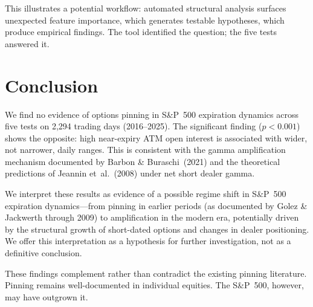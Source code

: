 \documentclass[11pt]{article}
\begin{document}
This illustrates a potential workflow: automated structural analysis surfaces unexpected feature importance, which generates testable hypotheses, which produce empirical findings. The tool identified the question; the five tests answered it.

\section{Conclusion}

We find no evidence of options pinning in S\&P~500 expiration dynamics across five tests on 2{,}294 trading days (2016--2025). The significant finding ($p < 0.001$) shows the opposite: high near-expiry ATM open interest is associated with wider, not narrower, daily ranges. This is consistent with the gamma amplification mechanism documented by Barbon \& Buraschi~(2021) and the theoretical predictions of Jeannin et~al.~(2008) under net short dealer gamma.

We interpret these results as evidence of a possible regime shift in S\&P~500 expiration dynamics---from pinning in earlier periods (as documented by Golez \& Jackwerth through 2009) to amplification in the modern era, potentially driven by the structural growth of short-dated options and changes in dealer positioning. We offer this interpretation as a hypothesis for further investigation, not as a definitive conclusion.

These findings complement rather than contradict the existing pinning literature. Pinning remains well-documented in individual equities. The S\&P~500, however, may have outgrown it.
\end{document}
